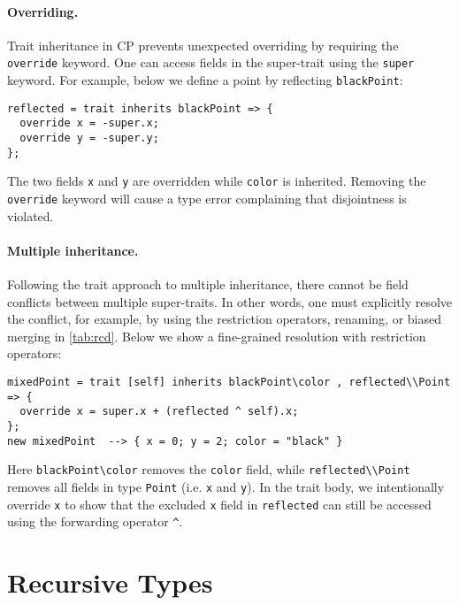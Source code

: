 \paragraph{Overriding.}
Trait inheritance in CP prevents unexpected overriding by requiring the
\lstinline{override} keyword. One can access fields in the super-trait using the
\lstinline{super} keyword. For example, below we define a point by reflecting
\lstinline{blackPoint}:
\begin{lstlisting}
reflected = trait inherits blackPoint => {
  override x = -super.x;
  override y = -super.y;
};
\end{lstlisting}
The two fields \lstinline{x} and \lstinline{y} are overridden while
\lstinline{color} is inherited. Removing the \lstinline{override} keyword will
cause a type error complaining that disjointness is violated.

\paragraph{Multiple inheritance.}
Following the trait approach to multiple inheritance, there cannot be field
conflicts between multiple super-traits. In other words, one must explicitly
resolve the conflict, for example, by using the restriction operators, renaming,
or biased merging in \autoref{tab:rcd}. Below we show a fine-grained resolution
with restriction operators:
\begin{lstlisting}
mixedPoint = trait [self] inherits blackPoint\color , reflected\\Point => {
  override x = super.x + (reflected ^ self).x;
};
new mixedPoint  --> { x = 0; y = 2; color = "black" }
\end{lstlisting}
Here \lstinline{blackPoint\color} removes the \lstinline{color} field, while
\lstinline{reflected\\Point} removes all fields in type \lstinline{Point} (i.e.
\lstinline{x} and \lstinline{y}). In the trait body, we intentionally override
\lstinline{x} to show that the excluded \lstinline{x} field in
\lstinline{reflected} can still be accessed using the forwarding operator
\lstinline{^}.

\section{Recursive Types}

